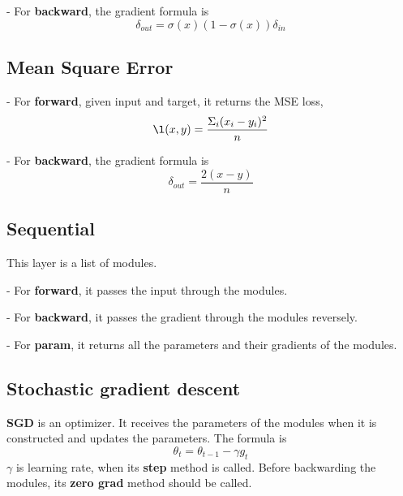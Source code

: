 - For \textbf{backward}, the gradient formula is 
\begin{equation}
    \delta_{out}=\sigma(x)(1-\sigma(x))\delta_{in}
\end{equation}



\subsection{Mean Square Error}

- For \textbf{forward}, given input and target, it returns the MSE loss, 
\begin{equation}
    \l(x, y)=\frac{\Sigma_i(x_i-y_i)^2}{n}
\end{equation}


- For \textbf{backward}, the gradient formula is
\begin{equation}
    \delta_{out}=\frac{2(x-y)}{n}
\end{equation}


\subsection{Sequential}

This layer is a list of modules. 

- For \textbf{forward}, it passes the input through the modules. 

- For \textbf{backward}, it passes the gradient through the modules reversely. 

- For \textbf{param}, it returns all the parameters and their gradients of the modules.



\subsection{Stochastic gradient descent}

\textbf{SGD} is an optimizer. It receives the parameters of the modules when it is constructed and updates the parameters. The formula is  
\begin{equation}
    \theta_t=\theta_{t-1}-\gamma g_t
\end{equation}
$\gamma$ is learning rate, when its \textbf{step} method is called. Before backwarding the modules, its \textbf{zero grad} method should be called. 








